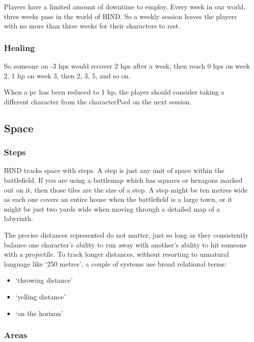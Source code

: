 \begin{multicols}{2}
Players have a limited amount of \gls{downtime} to employ.
Every week in our world, three weeks pass in the world of BIND.
So a weekly session leaves the players with no more than three weeks for their characters to rest.

\subsubsection{Healing}
\label{healing}

So someone on -3 \glspl{hp} would recover 2 \glspl{hp} after a week, then reach 0 \glspl{hp} on week 2, 1 \gls{hp} on week 3, then 2, 3, 5, and so on.

When a \gls{pc} has been reduced to 1 \gls{hp}, the player should consider taking a different character from the \gls{characterPool} on the next session.

\subsection{Space}
\label{space}

\subsubsection{Steps}

BIND tracks space with \glspl{step}.
A \gls{step} is just any unit of space within the battlefield.
If you are using a battlemap which has squares or hexagons marked out on it, then those tiles are the size of a step.
A step might be ten metres wide as each one covers an entire house when the battlefield is a large town, or it might be just two yards wide when moving through a detailed map of a labyrinth.

The precise distances represented do not matter, just so long as they consistently balance one character's ability to run away with another's ability to hit someone with a projectile.
To track longer distances, without resorting to unnatural language like `250 metres', a couple of systems use broad relational terms:

\begin{itemize}
  \item
  `throwing distance'
  \item
  `yelling distance'
  \item
  `on the horizon'
\end{itemize}

\subsubsection{Areas}


\end{multicols}
